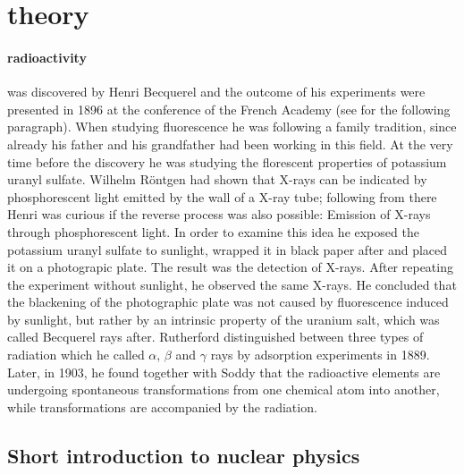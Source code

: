 \section{theory}
\label{sec:theory}
\paragraph{radioactivity} was discovered by Henri Becquerel and the outcome of his experiments
were presented in 1896 at the conference of the French Academy (see \cite{konya2012nuclear} for the
following paragraph). 
When studying 
fluorescence he was following a family tradition, since already his father and his grandfather had been
working in this field. At the very time before the discovery he was studying the florescent properties
of potassium uranyl sulfate. Wilhelm Röntgen had shown that X-rays can be indicated by phosphorescent light
emitted by the wall of a X-ray tube; following from there Henri was curious if the reverse process was also
possible: Emission of X-rays through phosphorescent light. In order to examine this idea he exposed
the potassium uranyl sulfate to sunlight, wrapped it in black paper after and placed it on a photograpic plate.
The result was the detection of X-rays. After repeating the experiment without sunlight, he observed the 
same X-rays. He concluded that the blackening of the photographic plate was not caused by fluorescence
induced by sunlight, but rather by an intrinsic property of the uranium salt, which was called Becquerel rays
after. Rutherford distinguished between three types of radiation which 
he called $\alpha$, $\beta$ and $\gamma$ rays
by adsorption experiments in 1889. Later, in 1903, he found together with Soddy that the radioactive elements
are undergoing spontaneous transformations from one chemical atom into another, while transformations
are accompanied by the radiation.
\subsection{Short introduction to nuclear physics}
